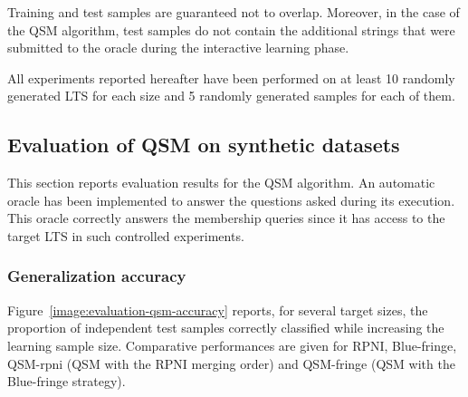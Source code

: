 Training and test samples are guaranteed not to overlap. Moreover, in the case of the QSM algorithm, test samples do not contain the additional strings that were submitted to the oracle during the interactive learning phase.

All experiments reported hereafter have been performed on at least 10 randomly generated LTS for each size and 5 randomly generated samples for each of them.

\subsection{Evaluation of QSM on synthetic datasets\label{subsection:evaluation-synthetic-qsm}}

This section reports evaluation results for the QSM algorithm. An automatic oracle has been implemented to answer the questions asked during its execution. This oracle correctly answers the membership queries since it has access to the target LTS in such controlled experiments.

\subsubsection*{Generalization accuracy}

Figure~\ref{image:evaluation-qsm-accuracy} reports, for several target sizes, the proportion of independent test samples correctly classified while increasing the learning sample size. Comparative performances are given for RPNI, Blue-fringe, QSM-rpni (QSM with the RPNI merging order) and QSM-fringe (QSM with the Blue-fringe strategy).


